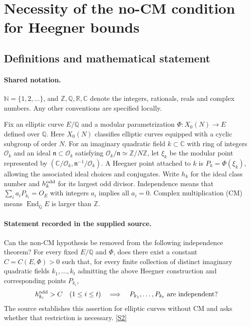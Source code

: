 \documentclass[11pt]{article}
\newcommand{\sref}[2]{\hyperlink{source:#1:#2}{[S#2]}}
\begin{document}
\section{Necessity of the no-CM condition for Heegner bounds}\label{statement}

\subsection{Definitions and mathematical statement}

\paragraph{Shared notation.}$\mathbb N=\{1,2,\ldots\}$, and $\mathbb Z,\mathbb Q,\mathbb R,\mathbb C$ denote the integers, rationals, reals and complex numbers. Any other conventions are specified locally.


Fix an elliptic curve $E/\mathbb Q$ and a modular parametrization $\Phi:X_0(N)\to E$ defined over $\mathbb Q$. Here $X_0(N)$ classifies elliptic curves equipped with a cyclic subgroup of order $N$. For an imaginary quadratic field $k\subset\mathbb C$ with ring of integers $\mathcal O_k$ and an ideal $\mathfrak n\subset\mathcal O_k$ satisfying $\mathcal O_k/\mathfrak n\simeq\mathbb Z/N\mathbb Z$, let $\xi_k$ be the modular point represented by $(\mathbb C/\mathcal O_k,\mathfrak n^{-1}/\mathcal O_k)$. A Heegner point attached to $k$ is $P_k=\Phi(\xi_k)$, allowing the associated ideal choices and conjugates. Write $h_k$ for the ideal class number and $h_k^{\rm odd}$ for its largest odd divisor. Independence means that $\sum_i a_iP_{k_i}=O_E$ with integers $a_i$ implies all $a_i=0$. Complex multiplication (CM) means $\operatorname{End}_{\overline{\mathbb Q}}E$ is larger than $\mathbb Z$.
\paragraph{Statement recorded in the supplied source.}
Can the non-CM hypothesis be removed from the following independence theorem? For every fixed $E/\mathbb Q$ and $\Phi$, does there exist a constant $C=C(E,\Phi)>0$ such that, for every finite collection of distinct imaginary quadratic fields $k_1,\ldots,k_t$ admitting the above Heegner construction and corresponding points $P_{k_i}$,
\[
 h_{k_i}^{\rm odd}>C\quad(1\le i\le t)
 \quad\Longrightarrow\quad P_{k_1},\ldots,P_{k_t}\text{ are independent}?
\]
The source establishes this assertion for elliptic curves without CM and asks whether that restriction is necessary. \sref{statement}{2}
\end{document}

